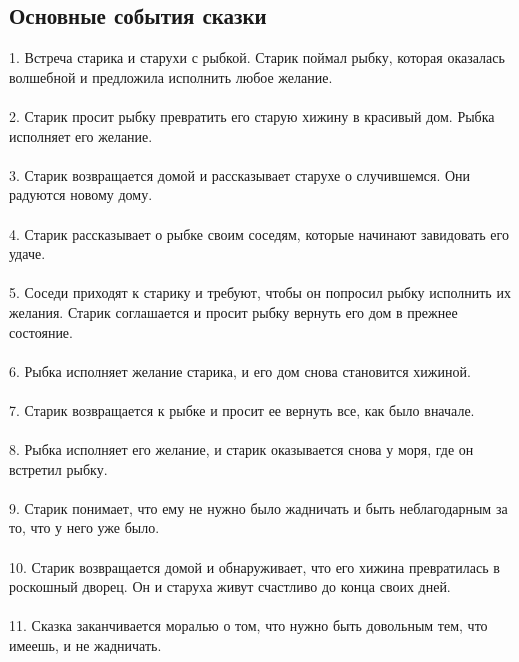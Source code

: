 \documentclass{article}
\begin{document}
\subsection{Основные события сказки}
1. Встреча старика и старухи с рыбкой. Старик поймал рыбку, которая оказалась волшебной и предложила исполнить любое желание.\\
~\\
2. Старик просит рыбку превратить его старую хижину в красивый дом. Рыбка исполняет его желание.\\
~\\
3. Старик возвращается домой и рассказывает старухе о случившемся. Они радуются новому дому.\\
~\\
4. Старик рассказывает о рыбке своим соседям, которые начинают завидовать его удаче.\\
~\\
5. Соседи приходят к старику и требуют, чтобы он попросил рыбку исполнить их желания. Старик соглашается и просит рыбку вернуть его дом в прежнее состояние.\\
~\\
6. Рыбка исполняет желание старика, и его дом снова становится хижиной.\\
~\\
7. Старик возвращается к рыбке и просит ее вернуть все, как было вначале.\\
~\\
8. Рыбка исполняет его желание, и старик оказывается снова у моря, где он встретил рыбку.\\
~\\
9. Старик понимает, что ему не нужно было жадничать и быть неблагодарным за то, что у него уже было.\\
~\\
10. Старик возвращается домой и обнаруживает, что его хижина превратилась в роскошный дворец. Он и старуха живут счастливо до конца своих дней.\\
~\\
11. Сказка заканчивается моралью о том, что нужно быть довольным тем, что имеешь, и не жадничать.
\end{document}
